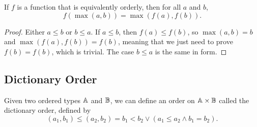 \documentclass[../../math.tex]{subfiles}
\begin{document}
\begin{theorem} \label{homo-max}
    If $f$ is a function that is equivalently orderly, then for all $a$ and $b$,
    \[
        f(\max(a, b)) = \max(f(a), f(b)).
    \]
\end{theorem}
\begin{proof}
    Either $a \leq b$ or $b \leq a$.  If $a \leq b$, then $f(a) \leq f(b)$, so
    $\max(a, b) = b$ and $\max(f(a), f(b)) = f(b)$, meaning that we just need to
    prove $f(b) = f(b)$, which is trivial.  The case $b \leq a$ is the same in
    form.
\end{proof}

\subsection{Dictionary Order}

\begin{definition}
    Given two ordered types $\mathbb{A}$ and $\mathbb{B}$, we can define an order on $\mathbb{A} \times
    \mathbb{B}$ called the dictionary order, defined by
    \[
        (a_1, b_1) \leq (a_2, b_2) = b_1 < b_2 \vee (a_1 \leq a_2 \wedge b_1 =
        b_2).
    \]
\end{definition}
\end{document}
